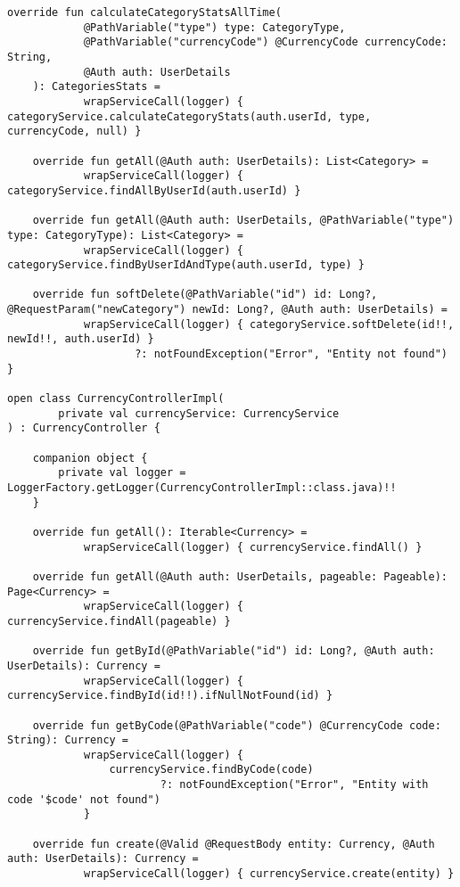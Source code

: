 \begin{lstlisting}[style = ktstyle]
    override fun calculateCategoryStatsAllTime(
            @PathVariable("type") type: CategoryType,
            @PathVariable("currencyCode") @CurrencyCode currencyCode: String,
            @Auth auth: UserDetails
    ): CategoriesStats =
            wrapServiceCall(logger) { categoryService.calculateCategoryStats(auth.userId, type, currencyCode, null) }

    override fun getAll(@Auth auth: UserDetails): List<Category> =
            wrapServiceCall(logger) { categoryService.findAllByUserId(auth.userId) }

    override fun getAll(@Auth auth: UserDetails, @PathVariable("type") type: CategoryType): List<Category> =
            wrapServiceCall(logger) { categoryService.findByUserIdAndType(auth.userId, type) }

    override fun softDelete(@PathVariable("id") id: Long?, @RequestParam("newCategory") newId: Long?, @Auth auth: UserDetails) =
            wrapServiceCall(logger) { categoryService.softDelete(id!!, newId!!, auth.userId) }
                    ?: notFoundException("Error", "Entity not found")
}

open class CurrencyControllerImpl(
        private val currencyService: CurrencyService
) : CurrencyController {

    companion object {
        private val logger = LoggerFactory.getLogger(CurrencyControllerImpl::class.java)!!
    }

    override fun getAll(): Iterable<Currency> =
            wrapServiceCall(logger) { currencyService.findAll() }

    override fun getAll(@Auth auth: UserDetails, pageable: Pageable): Page<Currency> =
            wrapServiceCall(logger) { currencyService.findAll(pageable) }

    override fun getById(@PathVariable("id") id: Long?, @Auth auth: UserDetails): Currency =
            wrapServiceCall(logger) { currencyService.findById(id!!).ifNullNotFound(id) }

    override fun getByCode(@PathVariable("code") @CurrencyCode code: String): Currency =
            wrapServiceCall(logger) {
                currencyService.findByCode(code)
                        ?: notFoundException("Error", "Entity with code '$code' not found")
            }

    override fun create(@Valid @RequestBody entity: Currency, @Auth auth: UserDetails): Currency =
            wrapServiceCall(logger) { currencyService.create(entity) }


\end{lstlisting}

